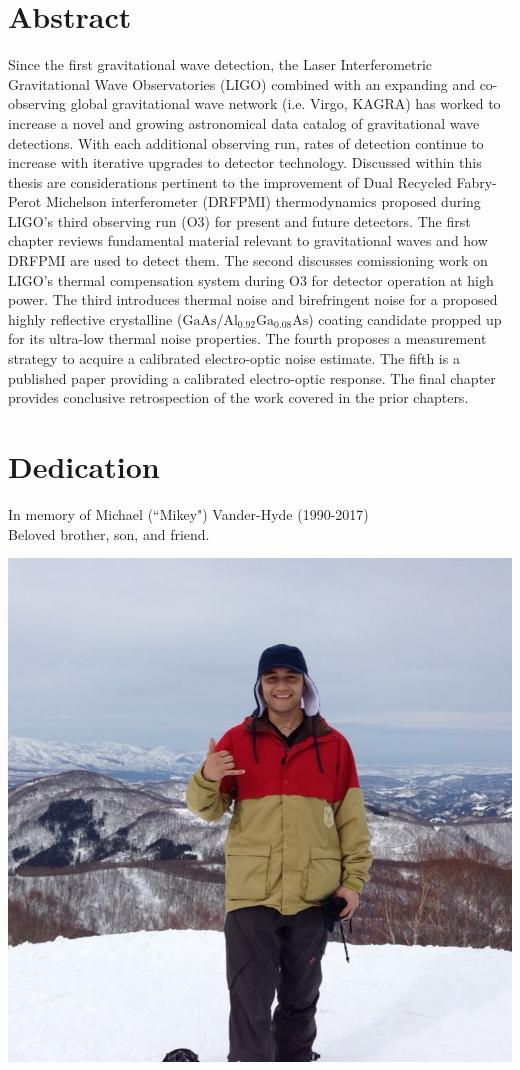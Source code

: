 \documentclass[12pt]{report}
\newcommand{\algaas}{\mathrm{Al_{0.92}Ga_{0.08}As}}
\newcommand{\gaas}{\mathrm{GaAs}}
\begin{document}
\chapter*{Abstract}
Since the first gravitational wave detection, the Laser Interferometric Gravitational Wave Observatories (LIGO) combined with an expanding and co-observing global gravitational wave network (i.e. Virgo, KAGRA) has worked to increase a novel and growing astronomical data catalog of gravitational wave detections. With each additional observing run, rates of detection continue to increase with iterative upgrades to detector technology. Discussed within this thesis are considerations pertinent to the improvement of Dual Recycled Fabry-Perot Michelson interferometer (DRFPMI) thermodynamics proposed during LIGO's third observing run (O3) for present and future detectors. The first chapter reviews fundamental material relevant to gravitational waves and how DRFPMI are used to detect them. The second discusses comissioning work on LIGO's thermal compensation system during O3 for detector operation at high power. The third introduces thermal noise and birefringent noise for a proposed highly reflective crystalline ($\gaas$/$\algaas$) coating candidate propped up for its ultra-low thermal noise properties. The fourth proposes a measurement strategy to acquire a calibrated electro-optic noise estimate. The fifth is a published paper providing a calibrated electro-optic response. The final chapter provides conclusive retrospection of the work covered in the prior chapters.  

\chapter*{Dedication}
In memory of Michael (``Mikey") Vander-Hyde (1990-2017)
\\
Beloved brother, son, and friend.

\begin{center}
\includegraphics[width=.75\textwidth]{mikey.jpeg}
\end{center}
\end{document}
